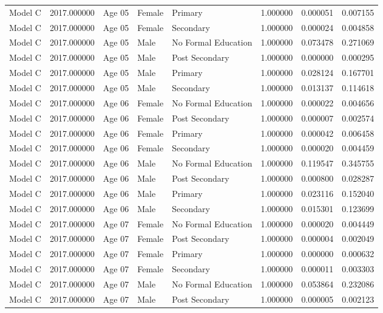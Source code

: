 \begin{table}[ht]
\begin{tabular}{lrlllrrr}
Model C & 2017.000000 & Age 05 & Female & Primary & 1.000000 & 0.000051 & 0.007155 \\
Model C & 2017.000000 & Age 05 & Female & Secondary & 1.000000 & 0.000024 & 0.004858 \\
Model C & 2017.000000 & Age 05 & Male & No Formal Education & 1.000000 & 0.073478 & 0.271069 \\
Model C & 2017.000000 & Age 05 & Male & Post Secondary & 1.000000 & 0.000000 & 0.000295 \\
Model C & 2017.000000 & Age 05 & Male & Primary & 1.000000 & 0.028124 & 0.167701 \\
Model C & 2017.000000 & Age 05 & Male & Secondary & 1.000000 & 0.013137 & 0.114618 \\
Model C & 2017.000000 & Age 06 & Female & No Formal Education & 1.000000 & 0.000022 & 0.004656 \\
Model C & 2017.000000 & Age 06 & Female & Post Secondary & 1.000000 & 0.000007 & 0.002574 \\
Model C & 2017.000000 & Age 06 & Female & Primary & 1.000000 & 0.000042 & 0.006458 \\
Model C & 2017.000000 & Age 06 & Female & Secondary & 1.000000 & 0.000020 & 0.004459 \\
Model C & 2017.000000 & Age 06 & Male & No Formal Education & 1.000000 & 0.119547 & 0.345755 \\
Model C & 2017.000000 & Age 06 & Male & Post Secondary & 1.000000 & 0.000800 & 0.028287 \\
Model C & 2017.000000 & Age 06 & Male & Primary & 1.000000 & 0.023116 & 0.152040 \\
Model C & 2017.000000 & Age 06 & Male & Secondary & 1.000000 & 0.015301 & 0.123699 \\
Model C & 2017.000000 & Age 07 & Female & No Formal Education & 1.000000 & 0.000020 & 0.004449 \\
Model C & 2017.000000 & Age 07 & Female & Post Secondary & 1.000000 & 0.000004 & 0.002049 \\
Model C & 2017.000000 & Age 07 & Female & Primary & 1.000000 & 0.000000 & 0.000632 \\
Model C & 2017.000000 & Age 07 & Female & Secondary & 1.000000 & 0.000011 & 0.003303 \\
Model C & 2017.000000 & Age 07 & Male & No Formal Education & 1.000000 & 0.053864 & 0.232086 \\
Model C & 2017.000000 & Age 07 & Male & Post Secondary & 1.000000 & 0.000005 & 0.002123 \\

\end{tabular}
\end{table}
